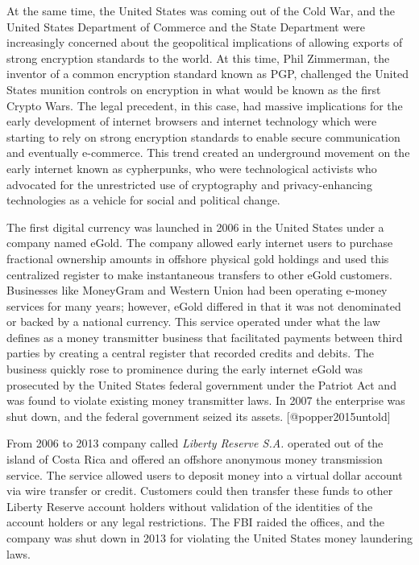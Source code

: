 At the same time, the United States was coming out of the Cold War, and the
United States Department of Commerce and the State Department were increasingly
concerned about the geopolitical implications of allowing exports of strong
encryption standards to the world. At this time, Phil Zimmerman, the inventor of
a common encryption standard known as PGP, challenged the United States munition
controls on encryption in what would be known as the first Crypto Wars. The
legal precedent, in this case, had massive implications for the early
development of internet browsers and internet technology which were starting to
rely on strong encryption standards to enable secure communication and
eventually e-commerce. This trend created an underground movement on the early
internet known as cypherpunks, who were technological activists who advocated
for the unrestricted use of cryptography and privacy-enhancing technologies as a
vehicle for social and political change.


The first digital currency was launched in 2006 in the United States under a
company named eGold. The company allowed early internet users to purchase
fractional ownership amounts in offshore physical gold holdings and used this
centralized register to make instantaneous transfers to other eGold customers.
Businesses like MoneyGram and Western Union had been operating e-money services
for many years; however, eGold differed in that it was not denominated or backed
by a national currency. This service operated under what the law defines as a
money transmitter business that facilitated payments between third parties by
creating a central register that recorded credits and debits. The business
quickly rose to prominence during the early internet eGold was prosecuted by the
United States federal government under the Patriot Act and was found to violate
existing money transmitter laws. In 2007 the enterprise was shut down, and the
federal government seized its assets. [@popper2015untold]
\cite{popper2015untold}


From 2006 to 2013 company called \textit{Liberty Reserve S.A.} operated out of
the island of Costa Rica and offered an offshore anonymous money transmission
service. The service allowed users to deposit money into a virtual dollar
account via wire transfer or credit. Customers could then transfer these funds
to other Liberty Reserve account holders without validation of the identities of
the account holders or any legal restrictions. The FBI raided the offices, and
the company was shut down in 2013 for violating the United States money
laundering laws.

